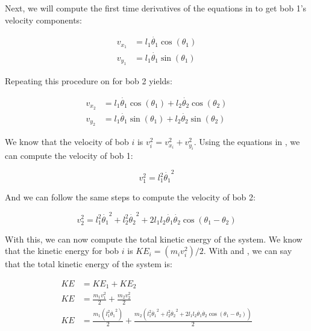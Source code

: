 Next, we will compute the first time derivatives of the equations in  to get bob 1's velocity components:

\begin{equation}
    \begin{aligned}
        v_{x_1} &= l_1\dot{\theta_1}\cos\left(\theta_1\right)\\
        v_{y_1} &= l_1\dot{\theta_1}\sin\left(\theta_1\right)
    \end{aligned}
    \label{eq:bob-1-velocity-components}
\end{equation}

Repeating this procedure on  for bob 2 yields:

\begin{equation}
    \begin{aligned}
        v_{x_2} &= l_1\dot{\theta_1}\cos\left(\theta_1\right) + l_2\dot{\theta_2}\cos\left(\theta_2\right)\\
        v_{y_2} &= l_1\dot{\theta_1}\sin\left(\theta_1\right) + l_2\dot{\theta_2}\sin\left(\theta_2\right)
    \end{aligned}
    \label{eq:bob-2-velocity-components}
\end{equation}

We know that the velocity of bob $i$ is $v_i^2 = v_{x_i}^2 + v_{y_i}^2$. Using the equations in , we can compute the velocity of bob 1:

\begin{equation}
    v_1^2 = l_1^2\dot{\theta_1}^2
    \label{eq:bob-1-velocity}
\end{equation}

And we can follow the same steps to compute the velocity of bob 2:

\begin{equation}
    v_2^2 = l_1^2\dot{\theta_1}^2 + l_2^2\dot{\theta_2}^2 + 2l_1l_2\dot{\theta_1}\dot{\theta_2}\cos\left(\theta_1 - \theta_2\right)
    \label{eq:bob-2-velocity}
\end{equation}

With this, we can now compute the total kinetic energy of the system. We know that the kinetic energy for bob $i$ is $KE_i = \left(m_i v_i^2\right)/2$. With  and , we can say that the total kinetic energy of the system is:

\begin{align*}
    KE &= KE_1 + KE_2\\
    KE &= \frac{m_1 v_1^2}{2} + \frac{m_2 v_2^2}{2}\\
    KE &= \frac{m_1 \left(l_1^2\dot{\theta_1}^2\right)}{2} + \frac{m_2 \left(l_1^2\dot{\theta_1}^2 + l_2^2\dot{\theta_2}^2 + 2l_1l_2\dot{\theta_1}\dot{\theta_2}\cos\left(\theta_1 - \theta_2\right)\right)}{2}
\end{align*}

